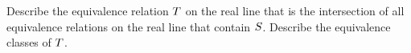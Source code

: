 \documentclass[main.tex]{subfiles}
\begin{document}
\subproblem{}\label{s03p05c}

Describe the equivalence relation \({T}\) on the real line that is the
intersection of all equivalence relations on the real line that contain
\({S}\). Describe the equivalence classes of \({T}\).

\todo{}
\end{document}
